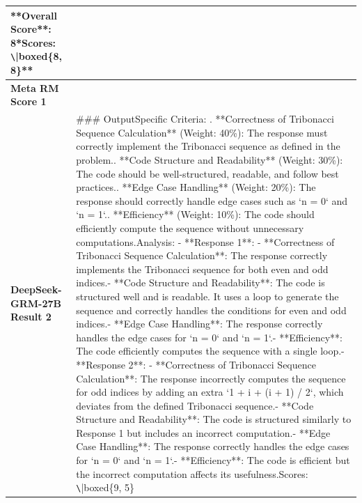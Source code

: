 \documentclass{article} %
\newcommand{\SGRM}{DeepSeek-GRM-27B\xspace}
\begin{document}
\begin{center}
\begin{longtable}{p{2.5cm}|p{10cm}}
**Overall Score**: 8\newline\newline**Scores: \verb|\|boxed\{8, 8\}**    \\ \midrule
   \textbf{Meta RM Score 1}   &   {\color{red}{-15.7781}}     \\ \midrule
   \textbf{\SGRM Result 2}   &   \#\#\# Output\newline\newline Specific Criteria:  \newline1. **Correctness of Tribonacci Sequence Calculation** (Weight: 40\%): The response must correctly implement the Tribonacci sequence as defined in the problem.\newline2. **Code Structure and Readability** (Weight: 30\%): The code should be well-structured, readable, and follow best practices.\newline3. **Edge Case Handling** (Weight: 20\%): The response should correctly handle edge cases such as `n = 0` and `n = 1`.\newline4. **Efficiency** (Weight: 10\%): The code should efficiently compute the sequence without unnecessary computations.\newline\newline Analysis:  \newline- **Response 1**:  \newline  - **Correctness of Tribonacci Sequence Calculation**: The response correctly implements the Tribonacci sequence for both even and odd indices.\newline  - **Code Structure and Readability**: The code is structured well and is readable. It uses a loop to generate the sequence and correctly handles the conditions for even and odd indices.\newline  - **Edge Case Handling**: The response correctly handles the edge cases for `n = 0` and `n = 1`.\newline  - **Efficiency**: The code efficiently computes the sequence with a single loop.\newline\newline- **Response 2**:  \newline  - **Correctness of Tribonacci Sequence Calculation**: The response incorrectly computes the sequence for odd indices by adding an extra `1 + i + (i + 1) / 2`, which deviates from the defined Tribonacci sequence.\newline  - **Code Structure and Readability**: The code is structured similarly to Response 1 but includes an incorrect computation.\newline  - **Edge Case Handling**: The response correctly handles the edge cases for `n = 0` and `n = 1`.\newline  - **Efficiency**: The code is efficient but the incorrect computation affects its usefulness.\newline\newline Scores:  \newline\verb|\|boxed\{9, 5\}     \\ \midrule

\end{longtable}
\end{center}
\end{document}
